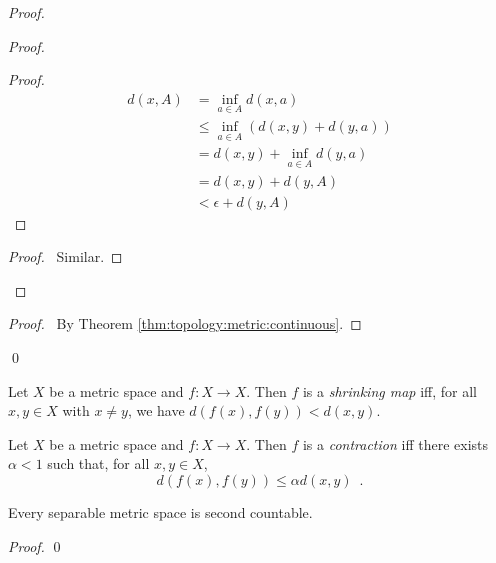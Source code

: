 \begin{proof}
  \pf
  \begin{proof}
    \pf
    \begin{proof}
      \pf
      \begin{align*}
        d(x, A) & = \inf_{a \in A} d(x, a) \\
        & \leq \inf_{a \in A} (d(x, y) + d(y, a)) \\
        & = d(x, y) + \inf_{a \in A} d(y, a) \\
        & = d(x, y) + d(y, A) \\
        & < \epsilon + d(y, A)
      \end{align*}
    \end{proof}
    \begin{proof}
      \pf\ Similar.
    \end{proof}
  \end{proof}
  \qedstep
  \begin{proof}
    \pf\ By Theorem \ref{thm:topology:metric:continuous}.
  \end{proof}
  \qed
\end{proof}

\begin{df}
  Let $X$ be a metric space and $f : X \rightarrow X$. Then $f$ is a
  \emph{shrinking map} iff, for all $x, y \in X$ with $x \neq y$, we have
  $d(f(x), f(y)) < d(x, y)$.
\end{df}

\begin{df}[Contraction]
  Let $X$ be a metric space and $f : X \rightarrow X$. Then $f$ is a
  \emph{contraction} iff there exists $\alpha < 1$ such that, for all $x, y
  \in X$,
  \[ d(f(x), f(y)) \leq \alpha d(x, y) \enspace . \]
\end{df}

\begin{prop}
  Every separable metric space is second countable.
\end{prop}

\begin{proof}
  \pf
  \qed
\end{proof}

